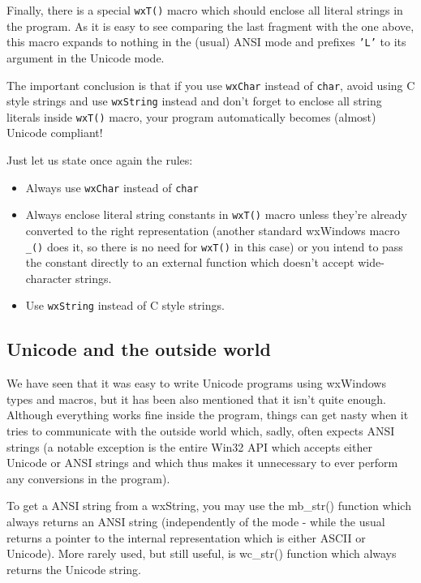 Finally, there is a special {\tt wxT()} macro which should enclose all literal
strings in the program. As it is easy to see comparing the last fragment with
the one above, this macro expands to nothing in the (usual) ANSI mode and
prefixes {\tt 'L'} to its argument in the Unicode mode.

The important conclusion is that if you use {\tt wxChar} instead of 
{\tt char}, avoid using C style strings and use {\tt wxString} instead and
don't forget to enclose all string literals inside {\tt wxT()} macro, your
program automatically becomes (almost) Unicode compliant!

Just let us state once again the rules:

\begin{itemize}
\item Always use {\tt wxChar} instead of {\tt char}
\item Always enclose literal string constants in {\tt wxT()} macro unless
they're already converted to the right representation (another standard
wxWindows macro {\tt \_()} does it, so there is no need for {\tt wxT()} in this
case) or you intend to pass the constant directly to an external function
which doesn't accept wide-character strings.
\item Use {\tt wxString} instead of C style strings.
\end{itemize}

\subsection{Unicode and the outside world}

We have seen that it was easy to write Unicode programs using wxWindows types
and macros, but it has been also mentioned that it isn't quite enough.
Although everything works fine inside the program, things can get nasty when
it tries to communicate with the outside world which, sadly, often expects
ANSI strings (a notable exception is the entire Win32 API which accepts either
Unicode or ANSI strings and which thus makes it unnecessary to ever perform
any conversions in the program).

To get a ANSI string from a wxString, you may use the 
mb\_str() function which always returns an ANSI
string (independently of the mode - while the usual 
 returns a pointer to the internal
representation which is either ASCII or Unicode). More rarely used, but still
useful, is wc\_str() function which always returns
the Unicode string.

